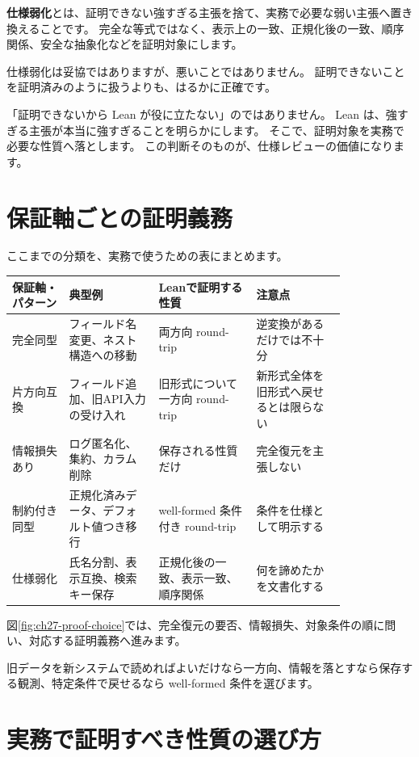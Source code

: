 \textbf{仕様弱化}とは、証明できない強すぎる主張を捨て、実務で必要な弱い主張へ置き換えることです。
完全な等式ではなく、表示上の一致、正規化後の一致、順序関係、安全な抽象化などを証明対象にします。

仕様弱化は妥協ではありますが、悪いことではありません。
証明できないことを証明済みのように扱うよりも、はるかに正確です。

「証明できないから Lean が役に立たない」のではありません。
Lean は、強すぎる主張が本当に強すぎることを明らかにします。
そこで、証明対象を実務で必要な性質へ落とします。
この判断そのものが、仕様レビューの価値になります。

\section{保証軸ごとの証明義務}

ここまでの分類を、実務で使うための表にまとめます。

\small
\begin{longtable}{p{0.14\linewidth}p{0.22\linewidth}p{0.24\linewidth}p{0.22\linewidth}}
\toprule
保証軸・パターン & 典型例 & Leanで証明する性質 & 注意点 \\
\midrule
完全同型 & フィールド名変更、ネスト構造への移動 & 両方向 round-trip & 逆変換があるだけでは不十分 \\
\midrule
片方向互換 & フィールド追加、旧API入力の受け入れ & 旧形式について一方向 round-trip & 新形式全体を旧形式へ戻せるとは限らない \\
\midrule
情報損失あり & ログ匿名化、集約、カラム削除 & 保存される性質だけ & 完全復元を主張しない \\
\midrule
制約付き同型 & 正規化済みデータ、デフォルト値つき移行 & well-formed 条件付き round-trip & 条件を仕様として明示する \\
\midrule
仕様弱化 & 氏名分割、表示互換、検索キー保存 & 正規化後の一致、表示一致、順序関係 & 何を諦めたかを文書化する \\
\bottomrule
\end{longtable}
\normalsize

図\ref{fig:ch27-proof-choice}では、完全復元の要否、情報損失、対象条件の順に問い、対応する証明義務へ進みます。

旧データを新システムで読めればよいだけなら一方向、情報を落とすなら保存する観測、特定条件で戻せるなら well-formed 条件を選びます。


\section{実務で証明すべき性質の選び方}

